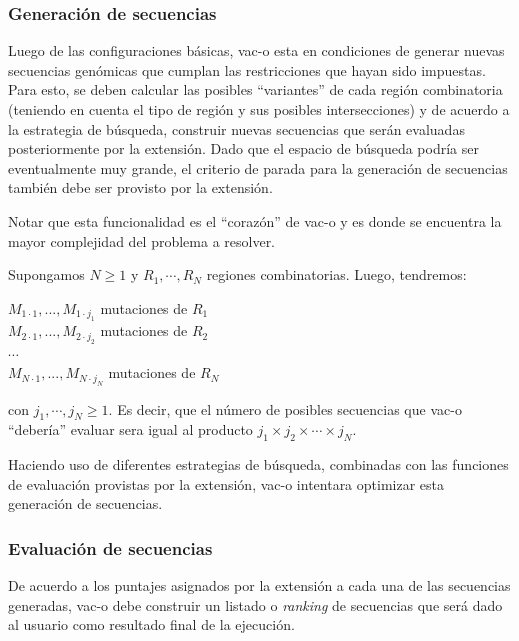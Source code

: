 \documentclass[10pt,a4paper]{article}
\begin{document}
  \subsubsection{Generaci\'on de secuencias}
  Luego de las configuraciones b\'asicas, vac-o esta en condiciones de generar
nuevas secuencias gen\'omicas que cumplan las restricciones que hayan sido
impuestas. Para esto, se deben calcular las posibles ``variantes'' de cada
regi\'on combinatoria (teniendo en cuenta el tipo de regi\'on y sus posibles
intersecciones) y de acuerdo a la estrategia de b\'usqueda, construir nuevas
secuencias que ser\'an evaluadas posteriormente por la extensi\'on. Dado que el
espacio de b\'usqueda podr\'ia ser eventualmente muy grande, el criterio de
parada para la generaci\'on de secuencias tambi\'en debe ser provisto por la
extensi\'on.

  Notar que esta funcionalidad es el ``coraz\'on'' de vac-o y es donde se
encuentra la mayor complejidad del problema a resolver. 

  Supongamos $N \geqslant 1$ y $R_{1}, \cdots, R_{N}$ regiones combinatorias.
Luego, tendremos: \\
  \begin{center}    
    $M_{1\cdot1},..., M_{1\cdot j_{1}}$ mutaciones de $R_{1}$\\ 
    $M_{2\cdot1},..., M_{2\cdot j_{2}}$ mutaciones de $R_{2}$\\
    $\cdots$ \\
    $M_{N\cdot1},..., M_{N\cdot j_{N}}$ mutaciones de $R_{N}$   
  \end{center}
  con $j_{1}, \cdots, j_{N} \geqslant 1$. Es decir, que el n\'umero de posibles
secuencias que vac-o ``deber\'ia'' evaluar sera igual al producto $j_{1} \times
j_{2} \times \cdots \times j_{N}$. 

  Haciendo uso de diferentes estrategias de b\'usqueda, combinadas con las
funciones de evaluaci\'on provistas por la extensi\'on, vac-o intentara
optimizar esta generaci\'on de secuencias.

  \subsubsection{Evaluaci\'on de secuencias}
  De acuerdo a los puntajes asignados por la extensi\'on a cada una de las
secuencias generadas, vac-o debe construir un listado o \textit{ranking} de
secuencias que ser\'a dado al usuario como resultado final de la ejecuci\'on.
\end{document}
